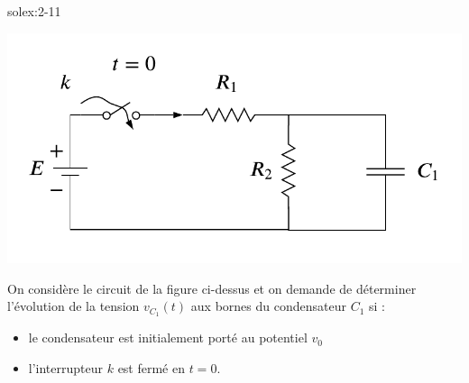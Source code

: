 \begin{exwithsol}{solex:2-11}
	\label{ex:2-11}
	\begin{center}
		\includegraphics[width=0.6\linewidth]{exercices/ex-3-11}
	\end{center}
	On consid\`ere le circuit de la figure ci-dessus et on demande de
	d\'eterminer l'\'evolution de la tension $v_{C_1}(t)$ aux bornes du
	condensateur $C_1$ si :
	\begin{itemize}
		\item le condensateur est initialement port\'e au potentiel $v_0$
		\item l'interrupteur $k$ est ferm\'e en $t=0$.
	\end{itemize}
	
\end{exwithsol}

